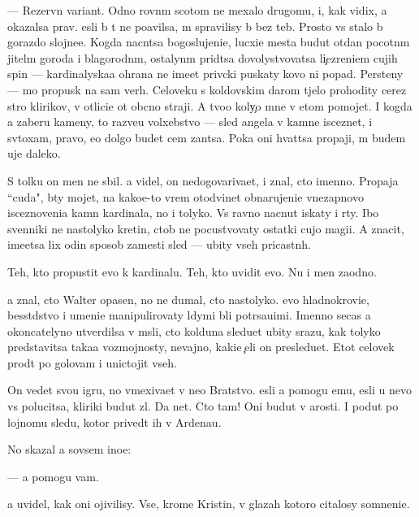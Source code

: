 \documentclass[10pt]{book}
\begin{document}
— Rezervn{\yi}{\y} variant. Odno rovn{\yi}m scotom ne mexalo drugomu, i, kak vidix, {\y}a okazalsa prav. {\Y}esli b{\yi} t{\yi} ne po{\y}avilsa, m{\yi} spravilisy b{\yi} bez teb{\ia}. Prosto vs{\e} stalo b{\yi} gorazdo slojne{\y}e. Kogda nacn{\e}tsa bogoslujeni{\y}e, lucxi{\y}e mesta budut otdan{\yi} pocotn{\yi}m jitel{\ia}m goroda i blagorodn{\yi}m, ostalyn{\yi}m prid{\e}tsa dovolystvovatsa li{\c}ezreni{\y}em cujih spin — kardinalyska{\y}a ohrana ne ime{\y}et priv{\yi}cki puskaty kovo ni popad{\ia}. Persteny — mo{\y} propusk na sam{\yi}{\y} verh. Celoveku s koldovskim darom t{\ia}jelo prohodity cerez stro{\y} klirikov, v otlici{\y}e ot ob{\yi}cno{\y} straji. A tvo{\y}o koly{\c}o mne v etom pomojet. I kogda {\y}a zaberu kameny, to razve{\y}u volxebstvo — sled angela v kamne isceznet, i sv{\ia}toxam, pravo, {\y}e{\x}o dolgo budet cem zan{\ia}tsa. Poka oni hvat{\ia}tsa propaji, m{\yi} budem uje daleko.

S tolku on men{\ia} ne sbil. {\Y}a videl, on nedogovariva{\y}et, i znal, cto imenno. Propaja ``cuda", b{\yi}ty mojet, na kako{\y}e-to vrem{\ia} otodvinet obnarujeni{\y}e vnezapnovo isceznoveni{\y}a kamn{\ia} kardinala, no i tolyko. Vs{\e} ravno nacnut iskaty i r{\yi}ty. Ibo sv{\ia}{\x}enniki ne nastolyko kretin{\yi}, ctob{\yi} ne pocustvovaty ostatki cujo{\y} magi{\y}i. A znacit, ime{\y}etsa lix odin sposob zamesti sled{\yi} — ubity vseh pricastn{\yi}h.

Teh, kto propustit {\y}evo k kardinalu. Teh, kto uvidit {\y}evo. Nu i men{\ia} zaodno.

{\Y}a znal, cto Walter opasen, no ne dumal, cto nastolyko. {\Y}evo hladnokrovi{\y}e, besst{\yi}dstvo i umeni{\y}e manipulirovaty l{\iu}dymi b{\yi}li potr{\ia}sa{\y}u{\x}imi. Imenno se{\y}cas {\y}a okoncatelyno utverdilsa v m{\yi}sli, cto kolduna sledu{\y}et ubity srazu, kak tolyko predstavitsa taka{\y}a vozmojnosty, nevajno, kaki{\y}e {\c}eli on presledu{\y}et. Etot celovek pro{\y}d{\e}t po golovam i unictojit vseh.

On vedet svo{\y}u igru, no vmexiva{\y}et v ne{\y}o Bratstvo. {\Y}esli {\y}a pomogu {\y}emu, {\y}esli u nevo vs{\e} polucitsa, kliriki budut zl{\yi}. Da net. Cto tam! Oni budut v {\y}arosti. I po{\y}dut po lojnomu sledu, kotor{\yi}{\y} prived{\e}t ih v Ardenau.

No skazal {\y}a sovsem ino{\y}e:

— {\Y}a pomogu vam.

{\Y}a uvidel, kak oni ojivilisy. Vse, krome Kristin{\yi}, v glazah kotoro{\y} citalosy somneni{\y}e.
\end{document}
